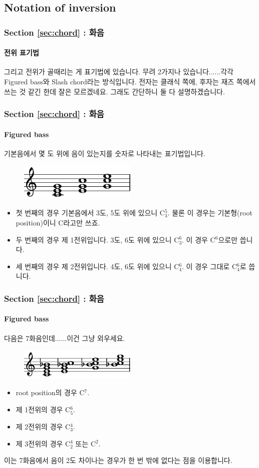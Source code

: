 \documentclass{beamer}
\begin{document}
	\subsection{Notation of inversion}
	\begin{frame}
		\frametitle{Section \ref{sec:chord} : 화음}
		\framesubtitle{전위 표기법}
		그리고 전위가 골때리는 게 표기법에 있습니다. 무려 2가지나 있습니다......각각 Figured bass와 Slash chord라는 방식입니다. 전자는 클래식 쪽에, 후자는 재즈 쪽에서 쓰는 것 같긴 한데 잘은 모르겠네요. 그래도 간단하니 둘 다 설명하겠습니다.
	\end{frame}
	
	\begin{frame}
		\frametitle{Section \ref{sec:chord} : 화음}
		\framesubtitle{Figured bass}
		기본음에서 몇 도 위에 음이 있는지를 숫자로 나타내는 표기법입니다.
		\vskip -1pc
		\begin{figure}
			\centering
			\includegraphics[width=0.5\textwidth]{res/pdf/9/inversion/triad.pdf}
		\end{figure}
		\vskip -2pc
		\begin{itemize}
			\item 첫 번째의 경우 기본음에서 3도, 5도 위에 있으니 C$^5_3$. 물론 이 경우는 기본형(root position)이니 C라고만 쓰죠.
			\item 두 번째의 경우 제 1전위입니다. 3도, 6도 위에 있으니 C$^6_3$. 이 경우 C$^6$으로만 씁니다.
			\item 세 번째의 경우 제 2전위입니다. 4도, 6도 위에 있으니 C$^6_4$. 이 경우 그대로 C$^6_4$로 씁니다.
		\end{itemize}
	\end{frame}
	
	\begin{frame}
		\frametitle{Section \ref{sec:chord} : 화음}
		\framesubtitle{Figured bass}
		다음은 7화음인데......이건 그냥 외우세요.
		\vskip -1pc
		\begin{figure}
			\centering
			\includegraphics[width=0.5\textwidth]{res/pdf/9/inversion/7th.pdf}
		\end{figure}
		\vskip -2pc
		\begin{itemize}
			\item root position의 경우 C$^7$.
			\item 제 1전위의 경우 C$^6_5$.
			\item 제 2전위의 경우 C$^4_3$.
			\item 제 3전위의 경우 C$^4_2$ 또는 C$^2$.
		\end{itemize}
		이는 7화음에서 음이 2도 차이나는 경우가 한 번 밖에 없다는 점을 이용합니다.
	\end{frame}
	
\end{document}
